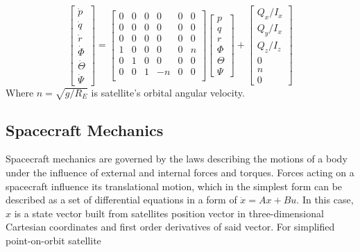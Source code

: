     \begin{equation}
        \begin{bmatrix}
        \dot{p} \\
        \dot{q} \\
        \dot{r} \\
        \dot{\Phi} \\
        \dot{\Theta} \\
        \dot{\Psi}
        \end{bmatrix}
        =
        \begin{bmatrix}
            0 & 0 & 0 & 0 & 0 & 0 \\
            0 & 0 & 0 & 0 & 0 & 0 \\
            0 & 0 & 0 & 0 & 0 & 0 \\
            1 & 0 & 0 & 0 & 0 & n \\
            0 & 1 & 0 & 0 & 0 & 0 \\
            0 & 0 & 1 & -n & 0 & 0 \\ 
        \end{bmatrix}
        \begin{bmatrix}
            p \\
            q \\
            r \\
            \Phi \\
            \Theta \\
            \Psi
        \end{bmatrix}
        +
        \begin{bmatrix}
            Q_x/I_x \\
            Q_y/I_x \\
            Q_z/I_z \\
            0 \\
            n \\
            0
            \end{bmatrix}
    \end{equation}\label{eqn:ssrotation}
    Where $n=\sqrt{g/R_E}$ is satellite's orbital angular velocity.

\subsection{Spacecraft Mechanics}
    Spacecraft mechanics are governed by the laws describing the motions of a body under the influence of external and internal forces and torques. Forces acting on a spacecraft influence its translational motion, which in the simplest form can be described as a set of differential equations in a form of $\dot{x} = Ax + Bu$. In this case, $x$ is a state vector built from satellites position vector in three-dimensional Cartesian coordinates and first order derivatives of said vector. For simplified point-on-orbit satellite 

